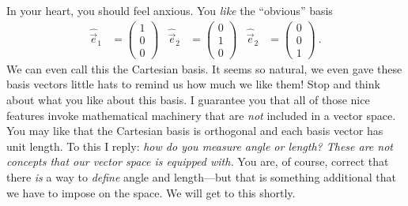 \documentclass[12pt]{article}
\begin{document}
In your heart, you should feel anxious. You \emph{like} the ``obvious'' basis 
\begin{align}
    \hat{\vec{e}}_1 &=
    \begin{pmatrix}
        1 \\ 0 \\ 0
    \end{pmatrix}
    &
    \hat{\vec{e}}_2 &=
    \begin{pmatrix}
        0 \\ 1 \\ 0
    \end{pmatrix}
    &
    \hat{\vec{e}}_2 &=
    \begin{pmatrix}
        0 \\ 0 \\ 1
    \end{pmatrix} \ .
\end{align}
We can even call this the Cartesian basis.
It seems so natural, we even gave these basis vectors little hats to remind us how much we like them! Stop and think about what you like about this basis. I guarantee you that all of those nice features invoke mathematical machinery that are \emph{not} included in a vector space. You may like that the Cartesian basis is orthogonal and each basis vector has unit length. To this I reply: \emph{how do you measure angle or length? These are not concepts that our vector space is equipped with.} You are, of course, correct that there \emph{is} a way to \emph{define} angle and length---but that is something additional that we have to impose on the space. We will get to this shortly.
\end{document}
